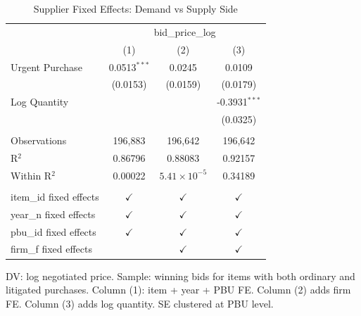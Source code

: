 \begin{table}[ht]
  \centering
  \caption{Supplier Fixed Effects: Demand vs Supply Side}
  \label{tab:supplier_fe}
  \small

\begingroup
\centering
\begin{tabular}{lccc}
   \toprule
    & \multicolumn{3}{c}{bid\_price\_log}\\
                           & (1)            & (2)                   & (3)\\  
   \midrule 
   Urgent Purchase         & 0.0513$^{***}$ & 0.0245                & 0.0109\\   
                           & (0.0153)       & (0.0159)              & (0.0179)\\   
   Log Quantity            &                &                       & -0.3931$^{***}$\\   
                           &                &                       & (0.0325)\\   
    \\
   Observations            & 196,883        & 196,642               & 196,642\\  
   R$^2$                   & 0.86796        & 0.88083               & 0.92157\\  
   Within R$^2$            & 0.00022        & $5.41\times 10^{-5}$  & 0.34189\\  
    \\
   item\_id fixed effects  & $\checkmark$   & $\checkmark$          & $\checkmark$\\   
   year\_n fixed effects   & $\checkmark$   & $\checkmark$          & $\checkmark$\\   
   pbu\_id fixed effects   & $\checkmark$   & $\checkmark$          & $\checkmark$\\   
   firm\_f fixed effects   &                & $\checkmark$          & $\checkmark$\\   
   \bottomrule
\end{tabular}
 
\par \raggedright 
DV: log negotiated price. Sample: winning bids for items with both ordinary and litigated purchases. Column (1): item + year + PBU FE. Column (2) adds firm FE. Column (3) adds log quantity. SE clustered at PBU level.
\par\endgroup


\end{table}
